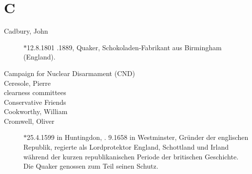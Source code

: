 \section*{C}

\articlesize

\begin{description}

 \item[Cadbury, John] $\ast$12.8.1801 .1889, Quaker, Schokoladen-Fabrikant aus Birmingham (England).

 \item[Campaign for Nuclear Disarmament (CND)]

 \item[Ceresole, Pierre]

 \item[clearness committees]

 \item[Conservative Friends]

 \item[Cookworthy, William]

 \item[Cromwell, Oliver] $\ast$25.4.1599 in Huntingdon, . 9.1658 in Westminster, Gründer der englischen Republik, regierte als Lordprotektor England, Schottland und Irland während der kurzen republikanischen Periode der britischen Geschichte. Die Quaker genossen zum Teil seinen Schutz.

 \end{description}

\normalsize